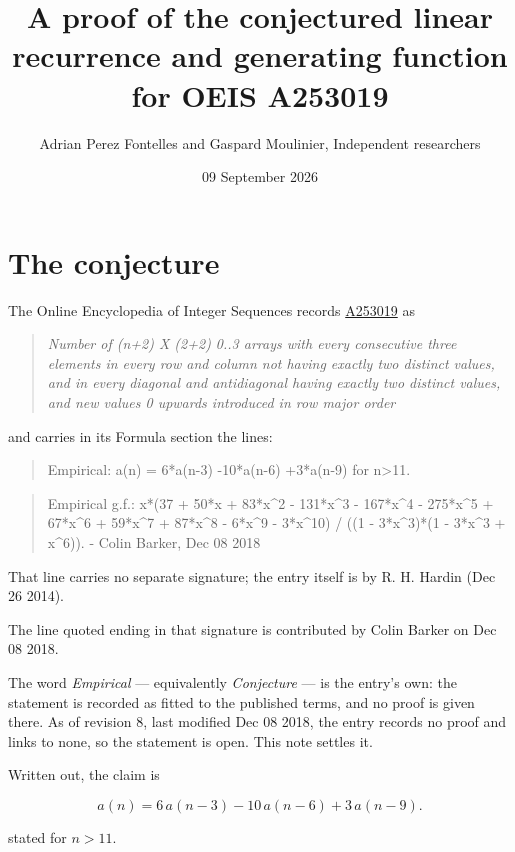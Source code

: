 \documentclass[11pt]{article}
\title{A proof of the conjectured linear recurrence and generating function for OEIS A253019}
\author{Adrian Perez Fontelles and Gaspard Moulinier, Independent researchers}
\date{09 September 2026}
\theoremstyle{definition}
\begin{document}
\maketitle
\section{The conjecture}

The Online Encyclopedia of Integer Sequences records \href{https://oeis.org/A253019}{A253019} as

\begin{quote}\itshape Number of (n+2) X (2+2) 0..3 arrays with every consecutive three elements in every row and column not having exactly two distinct values, and in every diagonal and antidiagonal having exactly two distinct values, and new values 0 upwards introduced in row major order\end{quote}

and carries in its Formula section the lines:

\begin{quote}\ttfamily Empirical: a(n) = 6*a(n-3) -10*a(n-6) +3*a(n-9) for n>11.\end{quote}

\begin{quote}\ttfamily Empirical g.f.: x*(37 + 50*x + 83*x\textasciicircum{}2 - 131*x\textasciicircum{}3 - 167*x\textasciicircum{}4 - 275*x\textasciicircum{}5 + 67*x\textasciicircum{}6 + 59*x\textasciicircum{}7 + 87*x\textasciicircum{}8 - 6*x\textasciicircum{}9 - 3*x\textasciicircum{}10) / ((1 - 3*x\textasciicircum{}3)*(1 - 3*x\textasciicircum{}3 + x\textasciicircum{}6)). - Colin Barker, Dec 08 2018\end{quote}

That line carries no separate signature; the entry itself is by R. H. Hardin (Dec 26 2014).

The line quoted ending in that signature is contributed by Colin Barker on Dec 08 2018.

The word {\itshape Empirical} --- equivalently {\itshape Conjecture} --- is the entry's own: the statement is recorded as fitted to the published terms, and no proof is given there. As of revision 8, last modified Dec 08 2018, the entry records no proof and links to none, so the statement is open. This note settles it.

Written out, the claim is

\[a(n) = 6\,a(n-3) - 10\,a(n-6) + 3\,a(n-9).\]

stated for $n > 11$.
\end{document}
